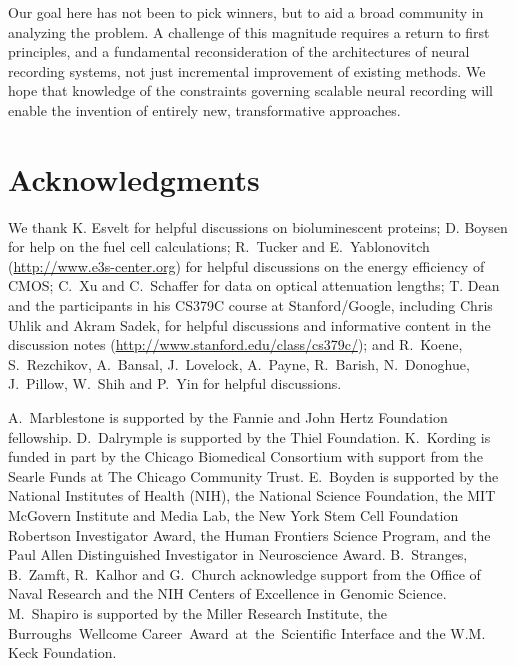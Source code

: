 Our goal here has not been to pick winners, but to aid a broad community in analyzing the problem.
A challenge of this magnitude requires a return to first principles, and a fundamental reconsideration of the architectures of neural recording systems, not just incremental improvement of existing methods.
We hope that knowledge of the constraints governing scalable neural recording will enable the invention of entirely new, transformative approaches.

\section{Acknowledgments}

We thank K. Esvelt for helpful discussions on bioluminescent proteins; D. Boysen for help on the fuel cell calculations; R.~Tucker and E.~Yablonovitch (\url{http://www.e3s-center.org}) for helpful discussions on the energy efficiency of CMOS; C.~Xu and C.~Schaffer for data on optical attenuation lengths; T. Dean and the participants in his CS379C course at Stanford/Google, including Chris Uhlik and Akram Sadek, for helpful discussions and informative content in the discussion notes (\url{http://www.stanford.edu/class/cs379c/}); and R.~Koene, S.~Rezchikov, A.~Bansal, J.~Lovelock, A.~Payne, R.~Barish, N.~Donoghue, J.~Pillow, W.~Shih and P.~Yin for helpful discussions.

A.~Marblestone is supported by the Fannie and John Hertz Foundation fellowship.
D.~Dalrymple is supported by the Thiel Foundation.
K.~Kording is funded in part by the Chicago Biomedical Consortium with support from the Searle Funds at The Chicago Community Trust.
E.~Boyden is supported by the National Institutes of Health (NIH), the National Science Foundation, the MIT
McGovern Institute and Media Lab, the New York Stem Cell Foundation Robertson Investigator
Award, the Human Frontiers Science Program, and the Paul Allen Distinguished Investigator in
Neuroscience Award.
B.~Stranges, B.~Zamft, R.~Kalhor and G.~Church acknowledge support from the Office of Naval Research and the NIH Centers of Excellence in Genomic Science.
M.~Shapiro is supported by the Miller Research Institute, the Burroughs~Wellcome Career~Award~at~the~Scientific Interface and the W.M. Keck Foundation.

\printbibliography[notsubtype=hide]


